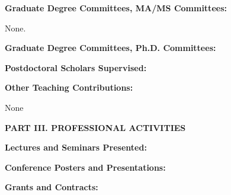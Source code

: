 \documentclass[10pt]{article}
\begin{document}
\vspace{1cm}
{\bf Graduate Degree Committees, MA/MS Committees:}
\vspace{0.25cm}

None.


\vspace{0.5cm}
{\bf Graduate Degree Committees, Ph.D. Committees:}
\vspace{0.25cm}



\vspace{0.5cm}
{\bf Postdoctoral Scholars Supervised:}


\vspace{0.5cm}
{\bf Other Teaching Contributions:}

None


\vspace{0.5cm}
\textbf{PART III.  PROFESSIONAL ACTIVITIES}

\vspace{0.5cm}
\textbf{Lectures and Seminars Presented:}
\vspace{0.25cm}
{\setlength{\extrarowheight}{3.5pt}

}


\vspace{0.5cm}
\textbf{Conference Posters and Presentations:}
\vspace{0.25cm}
{\setlength{\extrarowheight}{3.5pt}

}

\vspace{0.5cm}
\textbf{Grants and Contracts:}
\vspace{0.25cm}
{\setlength{\extrarowheight}{3.5pt}

}
\end{document}
